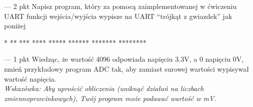 \documentclass{pdfBooklets}
\begin{document}
\begin{Zadanie}{ --- 2 pkt}
Napisz program, który za pomocą zaimplementowanej w ćwiczeniu UART funkcji wejścia/wyjścia wypisze na UART
``trójkąt z gwiazdek'' jak poniżej

\begin{CodeFrame*}[text]{}
*
**
***
****
*****
******
*******
********
\end{CodeFrame*}
\end{Zadanie}

\begin{Zadanie}{ --- 1 pkt}
Wiedząc, że wartość 4096 odpowiada napięciu 3.3V, a 0 napięciu 0V, zmień przykładowy program ADC tak, aby zamiast surowej
wartości wypisywał wartość napięcia.\\
\textit{Wskazówka: Aby uprościć obliczenia (uniknąć działań na liczbach zmiennoprzecinkowych), Twój program może podawać wartość w mV.}
\end{Zadanie}

\end{document}
